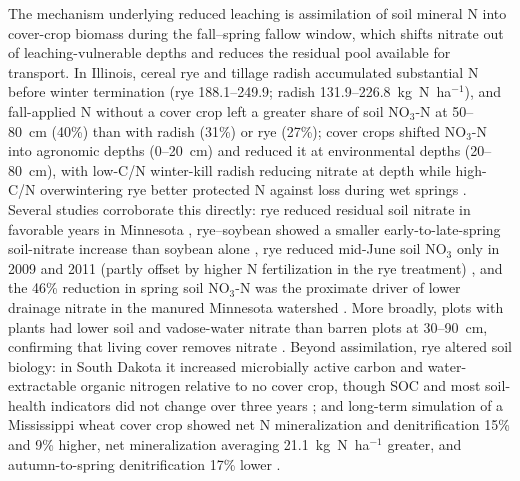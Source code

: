 The mechanism underlying reduced leaching is assimilation of soil mineral N into cover-crop biomass during the fall--spring fallow window, which shifts nitrate out of leaching-vulnerable depths and reduces the residual pool available for transport. In Illinois, cereal rye and tillage radish accumulated substantial N before winter termination (rye 188.1--249.9; radish 131.9--226.8~kg~N~ha$^{-1}$), and fall-applied N without a cover crop left a greater share of soil NO$_3$-N at 50--80~cm (40\%) than with radish (31\%) or rye (27\%); cover crops shifted NO$_3$-N into agronomic depths (0--20~cm) and reduced it at environmental depths (20--80~cm), with low-C/N winter-kill radish reducing nitrate at depth while high-C/N overwintering rye better protected N against loss during wet springs \parencite{Lacey2015}. Several studies corroborate this directly: rye reduced residual soil nitrate in favorable years in Minnesota \parencite{Strock2004}, rye--soybean showed a smaller early-to-late-spring soil-nitrate increase than soybean alone \parencite{Qi2011b}, rye reduced mid-June soil NO$_3$ only in 2009 and 2011 (partly offset by higher N fertilization in the rye treatment) \parencite{MartinezFeria2016}, and the 46\% reduction in spring soil NO$_3$-N was the proximate driver of lower drainage nitrate in the manured Minnesota watershed \parencite{Krueger2013}. More broadly, plots with plants had lower soil and vadose-water nitrate than barren plots at 30--90~cm, confirming that living cover removes nitrate \parencite{Bosompemaa2021}. Beyond assimilation, rye altered soil biology: in South Dakota it increased microbially active carbon and water-extractable organic nitrogen relative to no cover crop, though SOC and most soil-health indicators did not change over three years \parencite{Bawa2023}; and long-term simulation of a Mississippi wheat cover crop showed net N mineralization and denitrification 15\% and 9\% higher, net mineralization averaging 21.1~kg~N~ha$^{-1}$ greater, and autumn-to-spring denitrification 17\% lower \parencite{Yang2021}.

